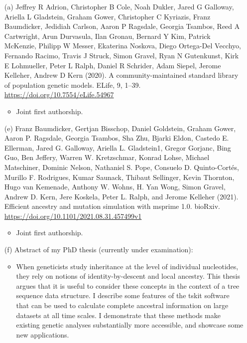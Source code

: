 \documentclass[11pt,a4paper,roman]{moderncv}        %
\begin{document}
{\begin{itemize}
\item[(a)]
Jeffrey R Adrion,
Christopher B Cole,
Noah Dukler,
Jared G Galloway,
Ariella L Gladstein,
Graham Gower,
Christopher C Kyriazis,
Franz Baumdicker,
Jedidiah Carlson,
Aaron P Ragsdale,
Georgia Tsambos,
Reed A Cartwright,
Arun Durvasula,
Ilan Gronau,
Bernard Y Kim,
Patrick McKenzie,
Philipp W Messer,
Ekaterina Noskova,
Diego Ortega-Del Vecchyo,
Fernando Racimo,
Travis J Struck,
Simon Gravel,
Ryan N Gutenkunst,
Kirk E Lohmueller,
Peter L Ralph,
Daniel R Schrider,
Adam Siepel,
Jerome Kelleher,
Andrew D Kern (2020). A community-maintained standard library of population genetic models. ELife, 9, 1–39. \url{https://doi.org/10.7554/eLife.54967}
\begin{itemize}
\item Joint first authorship.
\end{itemize}

\vspace{2mm}

\item[(e)]
Franz Baumdicker, Gertjan Bisschop, Daniel Goldstein,
Graham Gower, Aaron P. Ragsdale, Georgia Tsambos,
Sha Zhu, Bjarki Eldon, Castedo E. Ellerman,
Jared G. Galloway, Ariella L. Gladstein1, Gregor Gorjanc,
Bing Guo, Ben Jeffery, Warren W. Kretzschmar, Konrad Lohse,
Michael Matschiner, Dominic Nelson, Nathaniel S. Pope,
Consuelo D. Quinto-Cortés, Murillo F. Rodrigues,
Kumar Saunack, Thibaut Sellinger, Kevin Thornton,
Hugo van Kemenade, Anthony W. Wohns, H. Yan Wong,
Simon Gravel, Andrew D. Kern, Jere Koskela, Peter L. Ralph,
and Jerome Kelleher
(2021). Efficient ancestry and mutation simulation with msprime 1.0. bioRxiv. \url{https://doi.org/10.1101/2021.08.31.457499v1}
\begin{itemize}
\item Joint first authorship.
\end{itemize}

\vspace{2mm}

\item[(f)] Abstract of my PhD thesis (currently under examination):
\begin{itemize}
\item When geneticists study inheritance at the level of individual nucleotides, they rely on notions of identity-by-descent and local ancestry. This thesis argues that it is useful to consider these concepts in the context of a tree sequence data structure. I describe some features of the tskit software that can be used to calculate complete ancestral information on large datasets at all time scales. I demonstrate that these methods make existing genetic analyses substantially more accessible, and showcase some new applications.
\end{itemize}


\end{itemize}}
\end{document}
